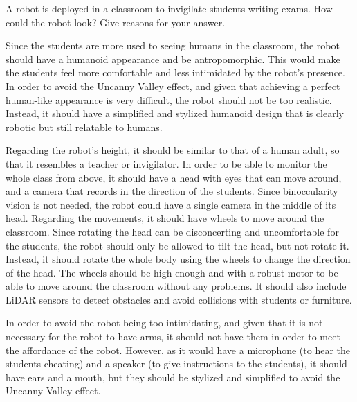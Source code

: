 \begin{ejercicio}
    A robot is deployed in a classroom to invigilate students writing exams. How could the robot look? Give reasons for your answer.

    Since the students are more used to seeing humans in the classroom, the robot should have a humanoid appearance and be antropomorphic. This would make the students feel more comfortable and less intimidated by the robot's presence. In order to avoid the Uncanny Valley effect, and given that achieving a perfect human-like appearance is very difficult, the robot should not be too realistic. Instead, it should have a simplified and stylized humanoid design that is clearly robotic but still relatable to humans.

    Regarding the robot's height, it should be similar to that of a human adult, so that it resembles a teacher or invigilator. In order to be able to monitor the whole class from above, it should have a head with eyes that can move around, and a camera that records in the direction of the students. Since binoccularity vision is not needed, the robot could have a single camera in the middle of its head. Regarding the movements, it should have wheels to move around the classroom. Since rotating the head can be disconcerting and uncomfortable for the students, the robot should only be allowed to tilt the head, but not rotate it. Instead, it should rotate the whole body using the wheels to change the direction of the head. The wheels should be high enough and with a robust motor to be able to move around the classroom without any problems. It should also include LiDAR sensors to detect obstacles and avoid collisions with students or furniture.

    In order to avoid the robot being too intimidating, and given that it is not necessary for the robot to have arms, it should not have them in order to meet the affordance of the robot. However, as it would have a microphone (to hear the students cheating) and a speaker (to give instructions to the students), it should have ears and a mouth, but they should be stylized and simplified to avoid the Uncanny Valley effect.
\end{ejercicio}


